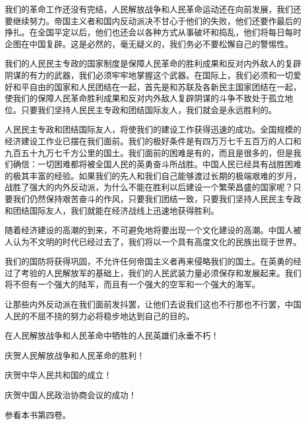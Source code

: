我们的革命工作还没有完结，人民解放战争和人民革命运动还在向前发展，我们还要继续努力。帝国主义者和国内反动派决不甘心于他们的失败，他们还要作最后的挣扎。在全国平定以后，他们也还会以各种方式从事破坏和捣乱，他们将每日每时企图在中国复辟。这是必然的，毫无疑义的，我们务必不要松懈自己的警惕性。

我们的人民民主专政的国家制度是保障人民革命的胜利成果和反对内外敌人的复辟阴谋的有力的武器，我们必须牢牢地掌握这个武器。在国际上，我们必须和一切爱好和平自由的国家和人民团结在一起，首先是和苏联及各新民主国家团结在一起，使我们的保障人民革命胜利成果和反对内外敌人复辟阴谋的斗争不致处于孤立地位。只要我们坚持人民民主专政和团结国际友人，我们就会是永远胜利的。

人民民主专政和团结国际友人，将使我们的建设工作获得迅速的成功。全国规模的经济建设工作业已摆在我们面前。我们的极好条件是有四万万七千五百万的人口和九百五十九万七千方公里的国土。我们面前的困难是有的，而且是很多的，但是我们确信：一切困难都将被全国人民的英勇奋斗所战胜。中国人民已经具有战胜困难的极其丰富的经验。如果我们的先人和我们自己能够渡过长期的极端艰难的岁月，战胜了强大的内外反动派，为什么不能在胜利以后建设一个繁荣昌盛的国家呢？只要我们仍然保持艰苦奋斗的作风，只要我们团结一致，只要我们坚持人民民主专政和团结国际友人，我们就能在经济战线上迅速地获得胜利。

随着经济建设的高潮的到来，不可避免地将要出现一个文化建设的高潮。中国人被人认为不文明的时代已经过去了，我们将以一个具有高度文化的民族出现于世界。

我们的国防将获得巩固，不允许任何帝国主义者再来侵略我们的国土。在英勇的经过了考验的人民解放军的基础上，我们的人民武装力量必须保存和发展起来。我们将不但有一个强大的陆军，而且有一个强大的空军和一个强大的海军。

让那些内外反动派在我们面前发抖罢，让他们去说我们这也不行那也不行罢，中国人民的不屈不挠的努力必将稳步地达到自己的目的。

在人民解放战争和人民革命中牺牲的人民英雄们永垂不朽！

庆贺人民解放战争和人民革命的胜利！

庆贺中华人民共和国的成立！

庆贺中国人民政治协商会议的成功！


\begin{maonote}
参看本书第四卷。
\end{maonote}
